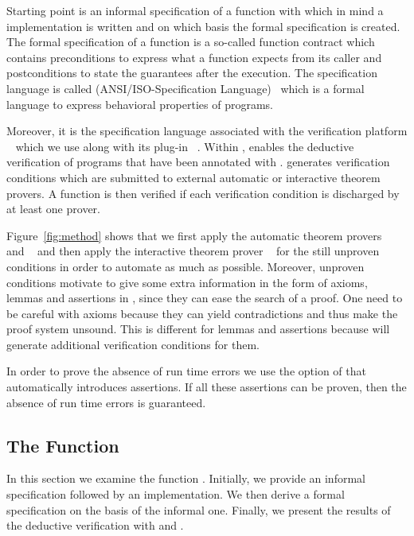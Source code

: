 Starting point is an informal specification of a function with which in mind
a implementation is written and on which basis the formal specification is created.
The formal specification of a function is a so-called function contract
which contains preconditions to express what a function expects from its caller
and postconditions to state the guarantees after the execution.
The specification language is called 
\acsl (ANSI\slash ISO-\isoc Specification Language)~\cite{acsl} 
which is a formal language to express behavioral properties of \isoc programs.

Moreover, it is the specification language associated with 
the verification platform \framac~\cite{FramaC}
which we use along with its plug-in \wpframac~\cite{wp}.
Within \framac, \wpframac enables the deductive verification of
\isoc programs that have been annotated with \acsl.
\wpframac generates verification conditions which are submitted to external 
automatic or interactive theorem provers.
A function is then verified if each verification condition is discharged
by at least one prover.

Figure~\ref{fig:method} shows that we first apply the automatic
theorem provers \altergo~\cite{alt-ergo} and \cvc~\cite{cvc3}
and then apply the
interactive theorem prover \coq~\cite{Coq}
for the still unproven conditions in order to automate as much as possible.
Moreover, unproven conditions motivate to give some extra information
in the form of axioms, lemmas and assertions in \acsl, 
since they can ease the search of a proof.
One need to be careful with axioms because they can yield contradictions
and thus make the proof system unsound.
This is different for lemmas and assertions
because \wpframac will generate additional verification conditions for them.

In order to prove the absence of run time errors we use
the  option of \wpframac that automatically introduces \acsl
assertions. If all these assertions can be proven, then
the absence of run time errors is guaranteed.


\clearpage

\subsection{The Function \peek}
\label{peek}


In this section we examine the function \peek.
Initially, we provide an informal specification 
followed by an implementation.
We then derive a formal specification on the basis of the informal one. 
Finally, we present the results of the deductive verification with \framac and \wpframac.



